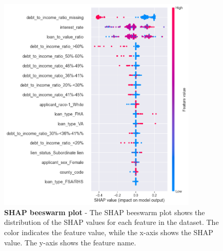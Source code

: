\begin{figure}[!htbp]
    \centering
    \includegraphics[width=0.85\textwidth]{images/SHAP_Individual_Analyses/beeswarm.png}
    \caption[SHAP beeswarm plot]{\textbf{SHAP beeswarm plot} - The SHAP beeswarm plot shows the distribution of the SHAP values for each feature in the dataset. The color indicates the feature value, while the x-axis shows the SHAP value. The y-axis shows the feature name.}
    \label{fig:SHAP_beeswarm}
\end{figure}

